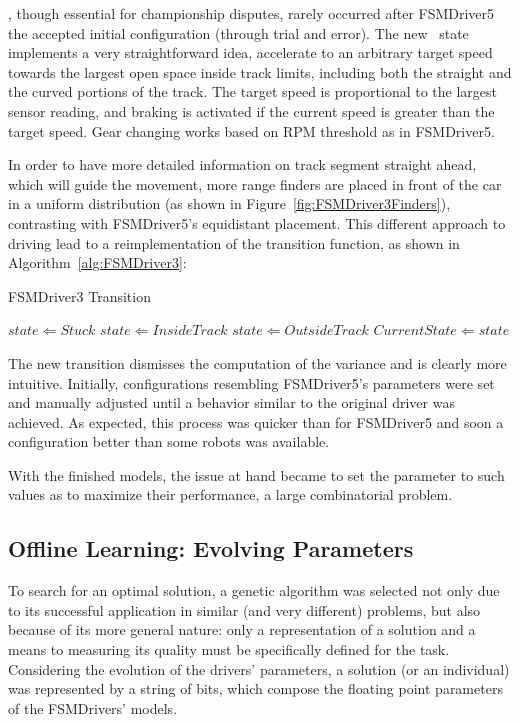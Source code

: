  \recovery, though essential for championship disputes, rarely occurred after FSMDriver5 the accepted initial configuration (through trial and error). The new \racing~state implements a very straightforward idea, accelerate to an arbitrary target speed towards the largest open space inside track limits, including both the straight and the curved portions of the track. The target speed is proportional to the largest sensor reading, and braking is activated if the current speed is greater than the target speed. Gear changing works based on RPM threshold as in FSMDriver5.

In order to have more detailed information on track segment straight ahead, which will guide the movement, more range finders are placed in front of the car in a uniform distribution (as shown in Figure~\ref{fig:FSMDriver3Finders}), contrasting with FSMDriver5's equidistant placement. This different approach to driving lead to a reimplementation of the transition function, as shown in Algorithm~\ref{alg:FSMDriver3}:

\begin{algorithm}[h]%
\caption{FSMDriver3 Transition}%
\label{alg:FSMDriver3}%
\begin{algorithmic}
        \STATE $state \Leftarrow Stuck$
    \ELSE
            \STATE $state \Leftarrow Inside Track$
        \ELSE
            \STATE $state \Leftarrow Outside Track$
        \ENDIF
    \ENDIF
        \STATE $Current State \Leftarrow state$
    \ENDIF
\end{algorithmic}
\end{algorithm}

The new transition dismisses the computation of the variance and is clearly more intuitive. Initially, configurations resembling FSMDriver5's parameters were set and manually adjusted until a behavior similar to the original driver was achieved. As expected, this process was quicker than for FSMDriver5 and soon a configuration better than some robots was available.

With the finished models, the issue at hand became to set the parameter to such values as to maximize their performance, a large combinatorial problem.

\subsection{Offline Learning: Evolving Parameters}%
To search for an optimal solution, a genetic algorithm was selected not only due to its successful application in similar (and very different) problems, but also because of its more general nature: only a representation of a solution and a means to measuring its quality must be specifically defined for the task. Considering the evolution of the drivers' parameters, a solution (or an individual) was represented by a string of bits, which compose the floating point parameters of the FSMDrivers' models.

